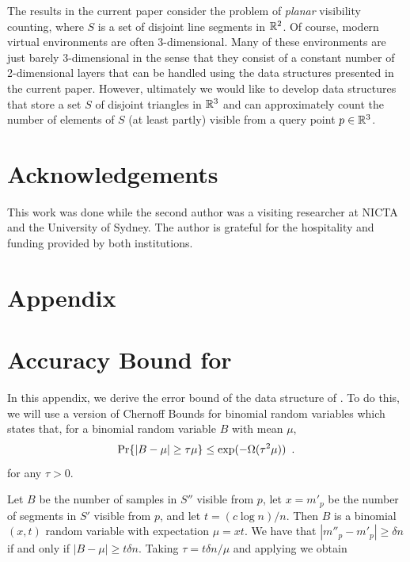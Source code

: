 \documentclass{patmorin}
\begin{document}
The results in the current paper consider the problem of \emph{planar}
visibility counting, where $S$ is a set of disjoint line segments in
$\mathbb{R}^2$.  Of course, modern virtual environments are often 3-dimensional.
Many of these environments are just barely 3-dimensional in the sense
that they consist of a constant number of 2-dimensional layers that can
be handled using the data structures presented in the current paper.
However, ultimately we would like to develop data structures that store
a set $S$ of disjoint triangles in $\mathbb{R}^3$ and can approximately count
the number of elements of $S$ (at least partly) visible from a query
point $p\in \mathbb{R}^3$.

\section*{Acknowledgements}

This work was done while the second author was a visiting researcher at NICTA
and the University of Sydney.  The author is grateful for the hospitality
and funding provided by both institutions.





\appendix

\section*{Appendix}

\section{Accuracy Bound for }

In this appendix, we derive the error bound of the data structure of
.  To do this, we will use a version of Chernoff Bounds
for binomial random variables \cite[Appendix~A.1]{as08} which states
that, for a binomial random variable $B$ with mean $\mu$,
\begin{equation}
  \Pr\{|B-\mu| \ge \tau\mu\}
     \le \exp(-\Omega(\tau^2\mu)) \enspace .
  \eqlabel{chernoff}
\end{equation}
for any $\tau > 0$.

Let $B$ be the number of samples in $S''$ visible from $p$, let $x=m'_p$
be the number of segments in $S'$ visible from $p$, and let $t=(c\log
n)/n$.  Then $B$ is a binomial$(x,t)$ random variable with expectation
$\mu = xt$.  We have that $|m''_p-m'_p|\ge \delta n$ if and only if
$|B-\mu|\ge t\delta n$.  Taking $\tau = t\delta n/\mu$ and applying
 we obtain
\end{document}
